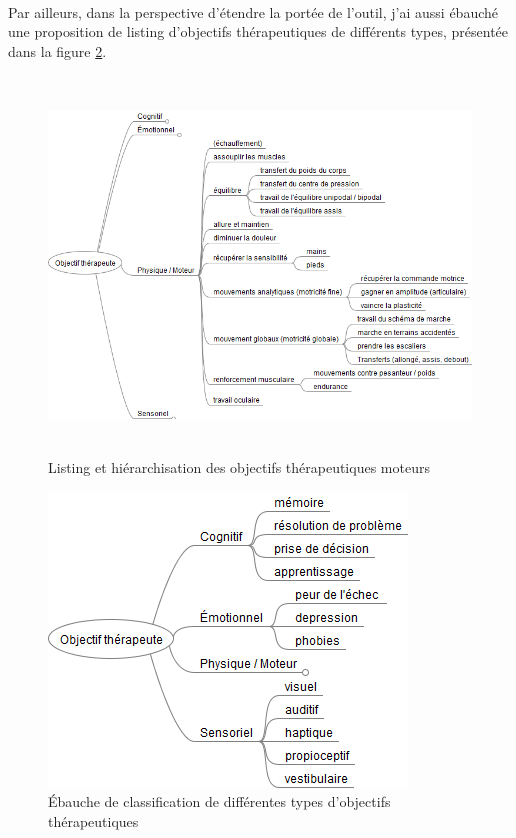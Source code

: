 \paragraph{}Par ailleurs, dans la perspective d'étendre la portée de l'outil, j'ai aussi ébauché une proposition de listing d'objectifs thérapeutiques de différents types, présentée dans la figure \ref{objectifs_autres}.

\begin{figure}[hbtp]
	\centering
	\includegraphics[width=16cm, height=10cm]{images/objectifs_moteurs}
	\caption{Listing et hiérarchisation des objectifs thérapeutiques moteurs}
	\label{objectifs_moteurs}
\end{figure}

\begin{figure}[hbtp]
	\centering
	\includegraphics[scale=0.7]{images/objectifs_autres}
	\caption{Ébauche de classification de différentes types d'objectifs thérapeutiques}
	\label{objectifs_autres}
\end{figure}

